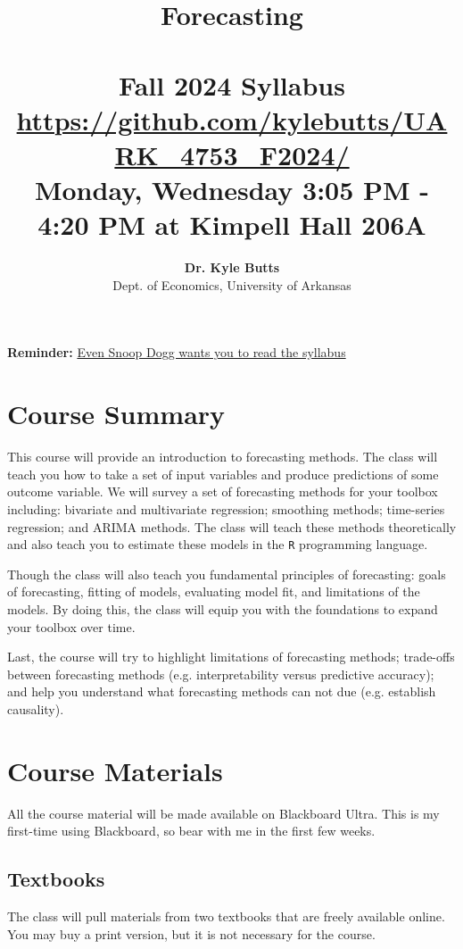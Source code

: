 \documentclass[12pt]{article}
\title{
  \vspace{-2em}
	{\huge \ttfamily \textbf{Forecasting}} \\[-0.5em]
  {\Large \ttfamily [ECON 4753]} \\
	{\large Fall 2024 Syllabus} \\[-1em]
  {\normalsize \ttfamily \href{https://github.com/kylebutts/UARK_4753_F2024/}{https://github.com/kylebutts/UARK\_4753\_F2024/}} \\[-0.5em]
  {\normalsize Monday, Wednesday 3:05 PM - 4:20 PM at Kimpell Hall 206A}
}
\author{
  {\large \textbf{Dr. Kyle Butts}} \\[-0.5em]
  {\normalsize Dept. of Economics, University of Arkansas}
}
\date{}  %
\begin{document}
\maketitle

\begin{callout}{}{\large\textbf{Reminder:} }
  \large
  \href{https://www.cameo.com/recipient/5f2b392a0299b100202e624a}{Even Snoop Dogg wants you to read the syllabus}
\end{callout}



\section*{Course Summary}

This course will provide an introduction to forecasting methods. The class will teach you how to take a set of input variables and produce predictions of some outcome variable. We will survey a set of forecasting methods for your toolbox including: bivariate and multivariate regression; smoothing methods; time-series regression; and ARIMA methods. The class will teach these methods theoretically and also teach you to estimate these models in the \texttt{R} programming language.

Though the class will also teach you fundamental principles of forecasting: goals of forecasting, fitting of models, evaluating model fit, and limitations of the models. By doing this, the class will equip you with the foundations to expand your toolbox over time. 

Last, the course will try to highlight limitations of forecasting methods; trade-offs between forecasting methods (e.g. interpretability versus predictive accuracy); and help you understand what forecasting methods can not due (e.g. establish causality). 


\section*{Course Materials}

All the course material will be made available on Blackboard Ultra. This is my first-time using Blackboard, so bear with me in the first few weeks.

\subsection*{Textbooks}

The class will pull materials from two textbooks that are freely available online. You may buy a print version, but it is not necessary for the course. 
\end{document}
